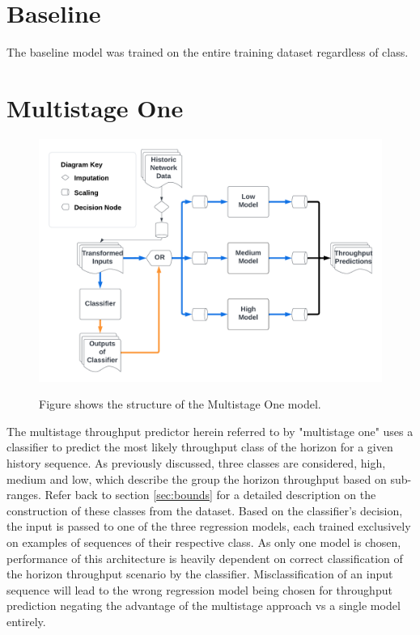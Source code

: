 \section{Baseline}
The baseline model was trained on the entire training dataset regardless of class.

\section{Multistage One}
\begin{figure}[h]
\centering
\includegraphics[scale=0.15]{Multistage One.png}
\label{fig:multistage_one}
\caption{Figure shows the structure of the Multistage One model.}
\end{figure}

The multistage throughput predictor herein referred to by "multistage one" uses a classifier to predict the most likely throughput class of the horizon for a given history sequence. As previously discussed, three classes are considered, high, medium and low, which describe the group the horizon throughput based on sub-ranges. Refer back to section \ref{sec:bounds} for a detailed description on the construction of these classes from the dataset. Based on the classifier's decision, the input is passed to one of the three regression models, each trained exclusively on examples of sequences of their respective class. As only one model is chosen, performance of this architecture is heavily dependent on correct classification of the horizon throughput scenario by the classifier. Misclassification of an input sequence will lead to the wrong regression model being chosen for throughput prediction negating the advantage of the multistage approach vs a single model entirely.

